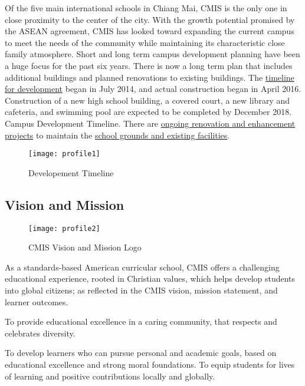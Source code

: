 Of the five main international schools in Chiang Mai, CMIS is the only one in close proximity to the center of the city.  With the growth potential promised by the ASEAN agreement, CMIS has looked toward expanding the current campus to meet the needs of the community while maintaining its characteristic close family atmosphere.  Short and long term campus development planning have been a huge focus for the past six years. There is now a long term plan that includes additional buildings and planned renovations to existing buildings.  The \href{https://docs.google.com/spreadsheets/d/12H8OtZlda_OBTVfUOYvEg0qghC6U9Xz93vGASmJF1hQ/edit#gid=0}{timeline for development} began in July 2014, and actual construction began in April 2016.  Construction of a new high school building, a covered court, a new library and cafeteria, and swimming pool are expected to be completed by December 2018.  Campus Development Timeline.  There are \href{https://docs.google.com/presentation/d/1o_AcPdYb1572Wbm7vk79ssg7RzkQykBGOqrKGVhTArw/edit#slide=id.ga51c5f54b_0_41}{ongoing renovation and enhancement projects} to maintain the \href{https://docs.google.com/presentation/d/1BSJvdHXlQ7o2US1hnvFOyPIcvA3WEPCRc9XYJAqlNt4/edit#slide=id.g540d23d42_034}{school grounds and existing facilities}.

\begin{figure}
\centering
\texttt{[image: profile1]}
\caption{Developement Timeline}
\end{figure}

\subsection{Vision and Mission}

\begin{figure}
\centering
\texttt{[image: profile2]}
\caption{CMIS Vision and Mission Logo}
\end{figure}

As a standards-based American curricular school, CMIS offers a challenging educational experience, rooted in Christian values, which helps develop students into global citizens; as reflected in the CMIS vision, mission statement, and learner outcomes.

To provide educational excellence in a caring community, that respects and celebrates diversity.

To develop learners who can pursue personal and academic goals, based on educational excellence and strong moral foundations. To equip students for lives of learning and positive contributions locally and globally.

